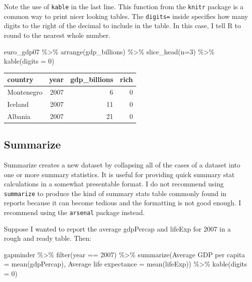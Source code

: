 \documentclass[
]{book}
\makeatletter
\newenvironment{Shaded}{\begin{snugshade}}{\end{snugshade}}
\newcommand{\AttributeTok}[1]{\textcolor[rgb]{0.61,0.61,0.61}{#1}}
\newcommand{\DecValTok}[1]{\textcolor[rgb]{0.06,0.06,0.06}{#1}}
\newcommand{\FunctionTok}[1]{\textcolor[rgb]{0,0,0}{#1}}
\newcommand{\NormalTok}[1]{#1}
\newcommand{\OtherTok}[1]{\textcolor[rgb]{0.37,0.37,0.37}{#1}}
\newcommand{\SpecialCharTok}[1]{\textcolor[rgb]{0,0,0}{#1}}
\newcommand{\StringTok}[1]{\textcolor[rgb]{0.5,0.5,0.5}{#1}}
\newenvironment{kframe}{%
\medskip{}
\setlength{\fboxsep}{.8em}
 \def\at@end@of@kframe{}%
 \ifinner\ifhmode%
  \def\at@end@of@kframe{\end{minipage}}%
  \begin{minipage}{\columnwidth}%
 \fi\fi%
 \def\FrameCommand##1{\hskip\@totalleftmargin \hskip-\fboxsep
 \colorbox{shadecolor}{##1}\hskip-\fboxsep
     \hskip-\linewidth \hskip-\@totalleftmargin \hskip\columnwidth}%
 \MakeFramed {\advance\hsize-\width
   \@totalleftmargin\z@ \linewidth\hsize
   \@setminipage}}%
 {\par\unskip\endMakeFramed%
 \at@end@of@kframe}
\renewenvironment{Shaded}{\begin{kframe}}{\end{kframe}}
\makeatother
\begin{document}
Note the use of \texttt{kable} in the last line. This function from the \texttt{knitr} package is a common way to print nicer looking tables. The \texttt{digits=} inside specifies how many digits to the right of the decimal to include in the table. In this case, I tell R to round to the nearest whole number.

\begin{Shaded}
\begin{Highlighting}[]
\NormalTok{euro\_gdp07 }\SpecialCharTok{\%\textgreater{}\%} 
  \FunctionTok{arrange}\NormalTok{(gdp\_billions) }\SpecialCharTok{\%\textgreater{}\%} 
  \FunctionTok{slice\_head}\NormalTok{(}\AttributeTok{n=}\DecValTok{3}\NormalTok{) }\SpecialCharTok{\%\textgreater{}\%} 
  \FunctionTok{kable}\NormalTok{(}\AttributeTok{digits =} \DecValTok{0}\NormalTok{)}
\end{Highlighting}
\end{Shaded}

\begin{tabular}{l|r|r|r}
\hline
country & year & gdp\_billions & rich\\
\hline
Montenegro & 2007 & 6 & 0\\
\hline
Iceland & 2007 & 11 & 0\\
\hline
Albania & 2007 & 21 & 0\\
\hline
\end{tabular}

\hypertarget{summarize}{%
\subsection{Summarize}\label{summarize}}

Summarize creates a new dataset by collapsing all of the cases of a dataset into one or more summary statistics. It is useful for providing quick summary stat calculations in a somewhat presentable format. I do not recommend using \texttt{summarize} to produce the kind of summary stats table commonly found in reports because it can become tedious and the formatting is not good enough. I recommend using the \texttt{arsenal} package instead.

Suppose I wanted to report the average gdpPercap and lifeExp for 2007 in a rough and ready table. Then:

\begin{Shaded}
\begin{Highlighting}[]
\NormalTok{gapminder }\SpecialCharTok{\%\textgreater{}\%} 
  \FunctionTok{filter}\NormalTok{(year }\SpecialCharTok{==} \DecValTok{2007}\NormalTok{) }\SpecialCharTok{\%\textgreater{}\%} 
  \FunctionTok{summarize}\NormalTok{(}\StringTok{\textquotesingle{}Average GDP per capita\textquotesingle{}} \OtherTok{=} \FunctionTok{mean}\NormalTok{(gdpPercap), }
            \StringTok{\textquotesingle{}Average life expectance\textquotesingle{}} \OtherTok{=} \FunctionTok{mean}\NormalTok{(lifeExp)) }\SpecialCharTok{\%\textgreater{}\%} 
  \FunctionTok{kable}\NormalTok{(}\AttributeTok{digits =} \DecValTok{0}\NormalTok{)}
\end{Highlighting}
\end{Shaded}
\end{document}
